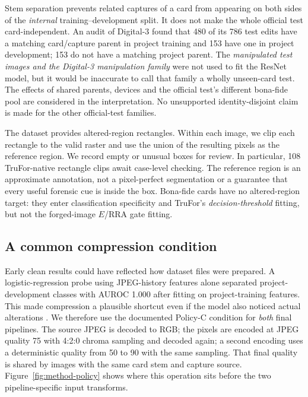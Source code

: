 Stem separation prevents related captures of a card from appearing on both sides of the \emph{internal} training--development split. It does not make the whole official test card-independent. An audit of Digital-3 found that 480 of its 786 test edits have a matching card/capture parent in project training and 153 have one in project development; 153 do not have a matching project parent. The \emph{manipulated test images and the Digital-3 manipulation family} were not used to fit the ResNet model, but it would be inaccurate to call that family a wholly unseen-card test. The effects of shared parents, devices and the official test's different bona-fide pool are considered in the interpretation. No unsupported identity-disjoint claim is made for the other official-test families.

The dataset provides altered-region rectangles. Within each image, we clip each rectangle to the valid raster and use the union of the resulting pixels as the reference region. We record empty or unusual boxes for review. In particular, 108 TruFor-native rectangle clips await case-level checking. The reference region is an approximate annotation, not a pixel-perfect segmentation or a guarantee that every useful forensic cue is inside the box. Bona-fide cards have no altered-region target: they enter classification specificity and TruFor's \emph{decision-threshold} fitting, but not the forged-image $E$/RRA gate fitting.

\subsection{A common compression condition}

Early clean results could have reflected how dataset files were prepared. A logistic-regression probe using JPEG-history features alone separated project-development classes with AUROC 1.000 after fitting on project-training features. This made compression a plausible shortcut even if the model also noticed actual alterations \citep{geirhos2020shortcut}. We therefore use the documented Policy-C condition for \emph{both} final pipelines. The source JPEG is decoded to RGB; the pixels are encoded at JPEG quality 75 with 4:2:0 chroma sampling and decoded again; a second encoding uses a deterministic quality from 50 to 90 with the same sampling. That final quality is shared by images with the same card stem and capture source. Figure~\ref{fig:method-policy} shows where this operation sits before the two pipeline-specific input transforms.

